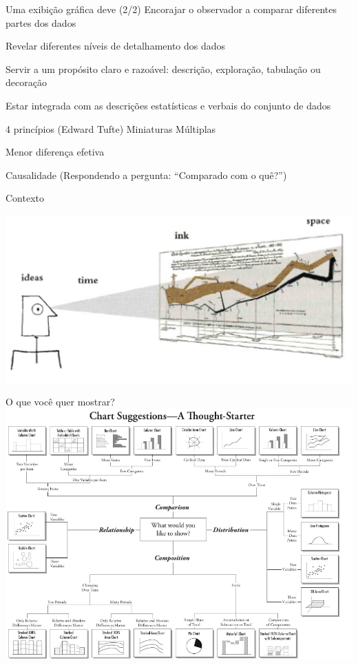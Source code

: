 \documentclass[
  9pt,
  ignorenonframetext,
]{beamer}
\begin{document}
\begin{frame}{Uma exibição gráfica deve (2/2)}
\protect\hypertarget{uma-exibiuxe7uxe3o-gruxe1fica-deve-22}{}
Encorajar o observador a comparar diferentes partes dos dados

Revelar diferentes níveis de detalhamento dos dados

Servir a um propósito claro e razoável: descrição, exploração, tabulação
ou decoração

Estar integrada com as descrições estatísticas e verbais do conjunto de
dados
\end{frame}

\begin{frame}{4 princípios (Edward Tufte)}
\protect\hypertarget{princuxedpios-edward-tufte}{}
Miniaturas Múltiplas

Menor diferença efetiva

Causalidade (Respondendo a pergunta: ``Comparado com o quê?'')

Contexto
\end{frame}

\begin{frame}{}
\protect\hypertarget{section-2}{}
\includegraphics{imgs/ideas_ink_space_time.png}
\end{frame}

\begin{frame}{O que você quer mostrar?}
\protect\hypertarget{o-que-vocuxea-quer-mostrar}{}
\includegraphics{imgs/Pic_2.png}
\end{frame}
\end{document}
